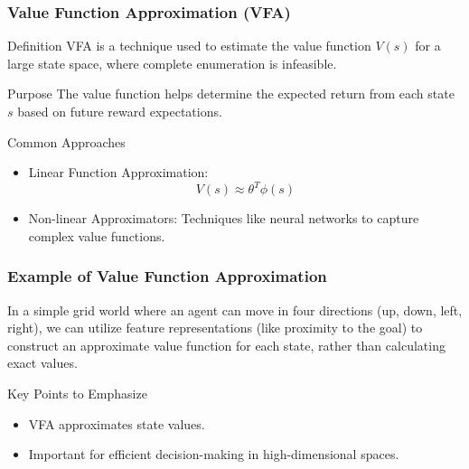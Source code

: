 \documentclass[aspectratio=169]{beamer}
\begin{document}
\begin{frame}[fragile]
    \frametitle{Value Function Approximation (VFA)}
    \begin{block}{Definition}
        VFA is a technique used to estimate the value function \( V(s) \) for a large state space, where complete enumeration is infeasible.
    \end{block}
    
    \begin{block}{Purpose}
        The value function helps determine the expected return from each state \( s \) based on future reward expectations.
    \end{block}

    \begin{block}{Common Approaches}
        \begin{itemize}
            \item Linear Function Approximation: 
            \[
            V(s) \approx \theta^T \phi(s)
            \]
            \item Non-linear Approximators: Techniques like neural networks to capture complex value functions.
        \end{itemize}
    \end{block}
\end{frame}

\begin{frame}[fragile]
    \frametitle{Example of Value Function Approximation}
    In a simple grid world where an agent can move in four directions (up, down, left, right), we can utilize feature representations (like proximity to the goal) to construct an approximate value function for each state, rather than calculating exact values.

    \begin{block}{Key Points to Emphasize}
        \begin{itemize}
            \item VFA approximates state values.
            \item Important for efficient decision-making in high-dimensional spaces.
        \end{itemize}
    \end{block}
\end{frame}
\end{document}
